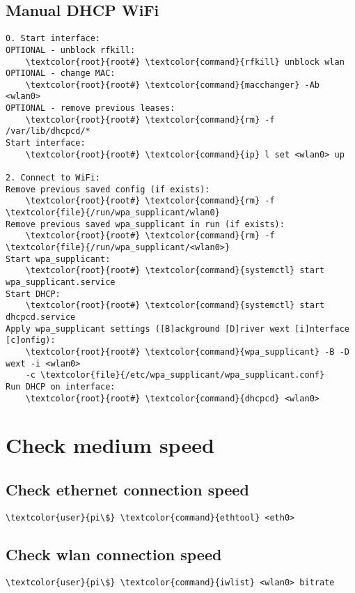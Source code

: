 \documentclass[10pt, a4paper, onecolumn, openany]{book} %
\begin{document}
\subsection{Manual DHCP WiFi}
\begin{Verbatim}[commandchars=\\\{\}]
0. Start interface:
OPTIONAL - unblock rfkill:
    \textcolor{root}{root#} \textcolor{command}{rfkill} unblock wlan
OPTIONAL - change MAC:
    \textcolor{root}{root#} \textcolor{command}{macchanger} -Ab <wlan0>
OPTIONAL - remove previous leases:
    \textcolor{root}{root#} \textcolor{command}{rm} -f /var/lib/dhcpcd/*
Start interface:
    \textcolor{root}{root#} \textcolor{command}{ip} l set <wlan0> up

2. Connect to WiFi:
Remove previous saved config (if exists):
    \textcolor{root}{root#} \textcolor{command}{rm} -f \textcolor{file}{/run/wpa_supplicant/wlan0}
Remove previous saved wpa_supplicant in run (if exists):    
    \textcolor{root}{root#} \textcolor{command}{rm} -f \textcolor{file}{/run/wpa_supplicant/<wlan0>}
Start wpa_supplicant:
    \textcolor{root}{root#} \textcolor{command}{systemctl} start wpa_supplicant.service
Start DHCP:
    \textcolor{root}{root#} \textcolor{command}{systemctl} start dhcpcd.service
Apply wpa_supplicant settings ([B]ackground [D]river wext [i]nterface [c]onfig):
    \textcolor{root}{root#} \textcolor{command}{wpa_supplicant} -B -D wext -i <wlan0>
    -c \textcolor{file}{/etc/wpa_supplicant/wpa_supplicant.conf}
Run DHCP on interface:
    \textcolor{root}{root#} \textcolor{command}{dhcpcd} <wlan0>
\end{Verbatim}

\section{Check medium speed}
\subsection{Check ethernet connection speed}
\begin{Verbatim}[commandchars=\\\{\}]
    \textcolor{user}{pi\$} \textcolor{command}{ethtool} <eth0>
\end{Verbatim}
\subsection{Check wlan connection speed}
\begin{Verbatim}[commandchars=\\\{\}]
    \textcolor{user}{pi\$} \textcolor{command}{iwlist} <wlan0> bitrate
\end{Verbatim}
\end{document}
